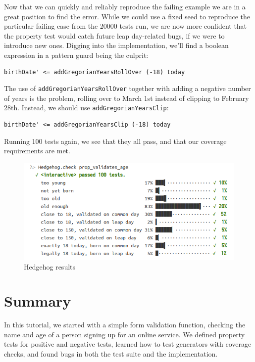 Now that we can quickly and reliably reproduce the failing example we
are in a great position to find the error. While we could use a fixed
seed to reproduce the particular failing case from the 20000 tests run,
we are now more confident that the property test would catch future leap
day-related bugs, if we were to introduce new ones. Digging into the
implementation, we'll find a boolean expression in a pattern guard being
the culprit:

\begin{verbatim}
birthDate' <= addGregorianYearsRollOver (-18) today
\end{verbatim}
The use of \texttt{addGregorianYearsRollOver} together with adding a
negative number of years is the problem, rolling over to March 1st
instead of clipping to February 28th. Instead, we should use
\texttt{addGregorianYearsClip}:

\begin{verbatim}
birthDate' <= addGregorianYearsClip (-18) today
\end{verbatim}
Running 100 tests again, we see that they all pass, and that our
coverage requirements are met.

\begin{figure}[htbp]
 \centering
 \includegraphics[width=\linewidth]{./pics/hedgehog7.png}
 \caption{Hedgehog results}
 \label{fig:hedgehog7}
\end{figure}

\section{Summary}\label{summary}

In this tutorial, we started with a simple form validation function,
checking the name and age of a person signing up for an online service.
We defined property tests for positive and negative tests, learned how
to test generators with coverage checks, and found bugs in both the test
suite and the implementation.

